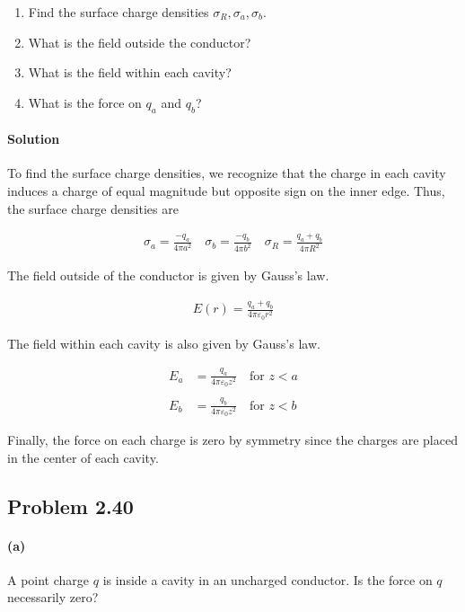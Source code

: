 \documentclass{article}
\begin{document}
\begin{enumerate}[label=(\alph*)]
    \item Find the surface charge densities $\sigma_R, \sigma_a, \sigma_b$.
    \item What is the field outside the conductor?
    \item What is the field within each cavity?
    \item What is the force on $q_a$ and $q_b$?
\end{enumerate}

\paragraph{Solution} To find the surface charge densities, we recognize that the charge in each cavity induces a charge of equal magnitude but opposite sign on the inner edge. Thus, the surface charge densities are 

\begin{align*}
    \sigma_a = \frac{-q_a}{4\pi a^2} \quad \sigma_b = \frac{-q_b}{4\pi b^2} \quad \sigma_R = \frac{q_a + q_b}{4\pi R^2}
\end{align*}

The field outside of the conductor is given by Gauss's law. 

\begin{align*}
    E(r) = \frac{q_a + q_b}{4\pi\varepsilon_0 r^2}
\end{align*}


The field within each cavity is also given by Gauss's law.

\begin{align*}
    E_a &= \frac{q_a}{4\pi \varepsilon_0 z^2} \quad \text{for } z < a \\
    \\
    E_b &= \frac{q_b}{4\pi \varepsilon_0 z^2} \quad \text{for } z < b
\end{align*}

Finally, the force on each charge is zero by symmetry since the charges are placed in the center of each cavity.

\newpage

\subsection*{Problem 2.40} 

\paragraph{(a)} A point charge $q$ is inside a cavity in an uncharged conductor.  Is the force on $q$ necessarily zero?
\end{document}
